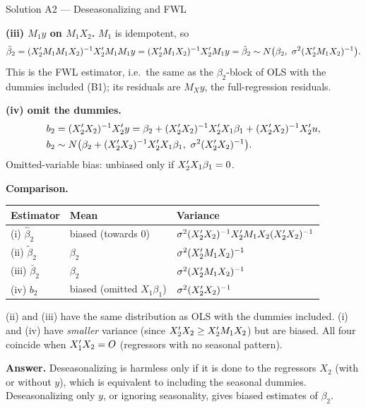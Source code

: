 \documentclass[11pt]{article}
\newcommand{\step}[1]{\par\smallskip\noindent\textbf{\textcolor{qnavy}{#1}}\quad\ignorespaces}
\newcommand{\Ans}[1]{\par\smallskip\noindent\colorbox{qlight}{\parbox{\dimexpr\linewidth-2\fboxsep}{\textbf{Answer.} #1}}\par}
\begin{document}
\begin{solbox}{Solution A2 --- Deseasonalizing and FWL}
\step{(iii) $M_{1}y$ on $M_{1}X_{2}$.} $M_{1}$ is idempotent, so
\[
  \bar\beta_{2} = (X_{2}^{\prime} M_{1}M_{1}X_{2})^{-1}X_{2}^{\prime} M_{1}M_{1}y
  = (X_{2}^{\prime} M_{1}X_{2})^{-1}X_{2}^{\prime} M_{1}y = \tilde\beta_{2}
  \sim N\big(\beta_{2},\ \sigma^{2}(X_{2}^{\prime} M_{1}X_{2})^{-1}\big).
\]
This is the FWL estimator, i.e.\ the same as the $\beta_{2}$-block of OLS with the
dummies included (B1); its residuals are $M_{X}y$, the full-regression residuals.

\step{(iv) omit the dummies.}
\begin{align*}
  b_{2} &= (X_{2}^{\prime} X_{2})^{-1}X_{2}^{\prime} y
   = \beta_{2} + (X_{2}^{\prime} X_{2})^{-1}X_{2}^{\prime} X_{1}\beta_{1} + (X_{2}^{\prime} X_{2})^{-1}X_{2}^{\prime} u,\\
  b_{2} &\sim N\big(\beta_{2} + (X_{2}^{\prime} X_{2})^{-1}X_{2}^{\prime} X_{1}\beta_{1},\
   \sigma^{2}(X_{2}^{\prime} X_{2})^{-1}\big).
\end{align*}
Omitted-variable bias: unbiased only if $X_{2}^{\prime} X_{1}\beta_{1} = 0$.

\step{Comparison.}
\begin{center}
\renewcommand{\arraystretch}{1.2}
\begin{tabular}{lll}
\toprule
Estimator & Mean & Variance \\
\midrule
(i) $\hat\beta_{2}$ & biased (towards 0) & $\sigma^{2}(X_{2}^{\prime} X_{2})^{-1}X_{2}^{\prime} M_{1}X_{2}(X_{2}^{\prime} X_{2})^{-1}$ \\
(ii) $\tilde\beta_{2}$ & $\beta_{2}$ & $\sigma^{2}(X_{2}^{\prime} M_{1}X_{2})^{-1}$ \\
(iii) $\bar\beta_{2}$ & $\beta_{2}$ & $\sigma^{2}(X_{2}^{\prime} M_{1}X_{2})^{-1}$ \\
(iv) $b_{2}$ & biased (omitted $X_{1}\beta_{1}$) & $\sigma^{2}(X_{2}^{\prime} X_{2})^{-1}$ \\
\bottomrule
\end{tabular}
\end{center}
(ii) and (iii) have the same distribution as OLS with the dummies included. (i) and
(iv) have \emph{smaller} variance (since $X_{2}^{\prime} X_{2} \ge X_{2}^{\prime} M_{1}X_{2}$) but are
biased. All four coincide when $X_{1}^{\prime} X_{2} = O$ (regressors with no seasonal pattern).
\Ans{Deseasonalizing is harmless only if it is done to the regressors $X_{2}$
(with or without $y$), which is equivalent to including the seasonal dummies.
Deseasonalizing only $y$, or ignoring seasonality, gives biased estimates of $\beta_{2}$.}
\end{solbox}
\end{document}

